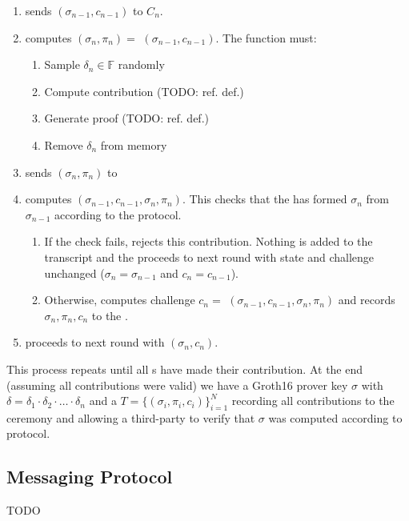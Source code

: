 \begin{enumerate}
\item \Coordinator{} sends $(\sigma_{n-1}, c_{n-1})$ to \Contributor{} $C_n$.
\item \Contributor{} computes $(\sigma_n, \pi_n) = $ \contribute{}$(\sigma_{n-1}, c_{n-1})$. The \contribute{} function must:
    \begin{enumerate}
        \item Sample $\delta_n \in \mathbb{F}$ randomly
        \item Compute contribution (TODO: ref. def.)
        \item Generate proof (TODO: ref. def.)
        \item Remove $\delta_n$ from memory
    \end{enumerate}
\item \Contributor{} sends $(\sigma_n, \pi_n)$ to \Coordinator{}
\item \Coordinator{} computes \verify{}$(\sigma_{n-1}, c_{n-1}, \sigma_n, \pi_n)$. This checks that the \Contributor{} has formed $\sigma_n$ from $\sigma_{n-1}$ according to the protocol.
    \begin{enumerate}
        \item If the check fails, \Coordinator{} rejects this contribution. Nothing is added to the transcript and the \Coordinator{} proceeds to next round with state and challenge unchanged ($\sigma_n = \sigma_{n-1}$ and $c_n = c_{n-1}$).
        \item Otherwise, \Coordinator{} computes challenge $c_n = $ \challenge$(\sigma_{n-1}, c_{n-1}, \sigma_n, \pi_n)$ and records $\sigma_n, \pi_n, c_n$ to the \Transcript{}.
    \end{enumerate}
\item \Coordinator{} proceeds to next round with $(\sigma_n, c_n)$.
\end{enumerate}
This process repeats until all \Contributor{}s have made their contribution. At the end (assuming all contributions were valid) we have a Groth16 prover key $\sigma$ with $\delta = \delta_1 \cdot \delta_2 \cdot \ldots \cdot \delta_n $ and a \Transcript{} $T = \{ (\sigma_i, \pi_i, c_i) \}_{i=1}^N $ recording all contributions to the ceremony and allowing a third-party to verify that $\sigma$ was computed according to protocol.

\subsection{Messaging Protocol}\label{sec: MessagingProtocol}
TODO 

